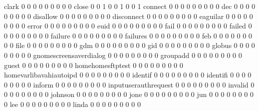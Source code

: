 \documentclass[compress,8pt]{beamer}
\begin{document}
\begin{frame}
\begin{Schunk}
  clark                                      0   0   0   0   0   0   0   0   0
  close                                      0   0   1   0   0   1   0   0   1
  connect                                    0   0   0   0   0   0   0   0   0
  dec                                        0   0   0   0   0   0   0   0   0
  disallow                                   0   0   0   0   0   0   0   0   0
  disconnect                                 0   0   0   0   0   0   0   0   0
  eaguilar                                   0   0   0   0   0   0   0   0   0
  error                                      0   0   0   0   0   0   0   0   0
  euid                                       0   0   0   0   0   0   0   0   0
  fail                                       0   0   0   0   0   0   0   0   0
  failed                                     0   0   0   0   0   0   0   0   0
  failure                                    0   0   0   0   0   0   0   0   0
  failures                                   0   0   0   0   0   0   0   0   0
  feb                                        0   0   0   0   0   0   0   0   0
  file                                       0   0   0   0   0   0   0   0   0
  gdm                                        0   0   0   0   0   0   0   0   0
  gid                                        0   0   0   0   0   0   0   0   0
  globus                                     0   0   0   0   0   0   0   0   0
  gnomescreensaverdialog                     0   0   0   0   0   0   0   0   0
  groupadd                                   0   0   0   0   0   0   0   0   0
  guest                                      0   0   0   0   0   0   0   0   0
  homehomesftptest                           0   0   0   0   0   0   0   0   0
  homevarlibavahiautoipd                     0   0   0   0   0   0   0   0   0
  identif                                    0   0   0   0   0   0   0   0   0
  identifi                                   0   0   0   0   0   0   0   0   0
  inform                                     0   0   0   0   0   0   0   0   0
  inputuserauthrequest                       0   0   0   0   0   0   0   0   0
  invalid                                    0   0   0   0   0   0   0   0   0
  johnson                                    0   0   0   0   0   0   0   0   0
  jone                                       0   0   0   0   0   0   0   0   0
  jun                                        0   0   0   0   0   0   0   0   0
  lee                                        0   0   0   0   0   0   0   0   0
  linda                                      0   0   0   0   0   0   0   0   0

\end{Schunk}
\end{frame}
\end{document}
